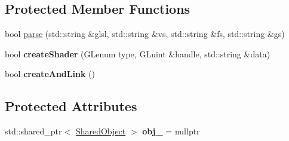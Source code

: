 \subsection*{Protected Member Functions}
\begin{DoxyCompactItemize}
\item 
bool \hyperlink{classs9_1_1gl_1_1Shader_a752c27cedbd57e19e221d7a249d483c8}{parse} (std\-::string \&glsl, std\-::string \&vs, std\-::string \&fs, std\-::string \&gs)
\item 
\hypertarget{classs9_1_1gl_1_1Shader_a482aa342af89d39643a0121a124dd96e}{bool {\bfseries create\-Shader} (G\-Lenum type, G\-Luint \&handle, std\-::string \&data)}\label{classs9_1_1gl_1_1Shader_a482aa342af89d39643a0121a124dd96e}

\item 
\hypertarget{classs9_1_1gl_1_1Shader_a910abe17f79bc3a369989c6b9a1629e2}{bool {\bfseries create\-And\-Link} ()}\label{classs9_1_1gl_1_1Shader_a910abe17f79bc3a369989c6b9a1629e2}

\end{DoxyCompactItemize}
\subsection*{Protected Attributes}
\begin{DoxyCompactItemize}
\item 
\hypertarget{classs9_1_1gl_1_1Shader_a2a7e5ef155add0af188c64d9f73be3cf}{std\-::shared\-\_\-ptr$<$ \hyperlink{structs9_1_1gl_1_1Shader_1_1SharedObject}{Shared\-Object} $>$ {\bfseries obj\-\_\-} = nullptr}\label{classs9_1_1gl_1_1Shader_a2a7e5ef155add0af188c64d9f73be3cf}

\end{DoxyCompactItemize}


